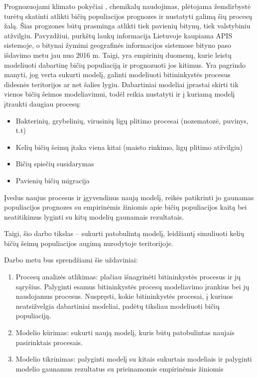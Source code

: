\documentclass{VUMIFKompMagistrinis}
\begin{document}
 Prognozuojami klimato pokyčiai \cite{IPC18}, chemikalų naudojimas, plėtojama žemdirbystė turėtų skatinti atlikti bičių populiacijos prognozes ir nustatyti galimą šių procesų žalą. Šias progzones būtų prasminga atlikti tiek pavienių bitynų, tiek valstybiniu atžvilgiu. Pavyzdžiui, purkštų laukų informacija Lietuvoje kaupiama APIS sistemoje, o bitynai žymimi geografinės informacijos sistemose bityno paso išdavimo metu jau nuo 2016 m. Taigi, yra empirinių duomenų, kurie leistų modeliuoti dabartinę bičių populiaciją ir prognozuoti jos kitimus. Yra pagrindo manyti, jog verta sukurti modelį, galinti modeliuoti bitininkystės procesus didesnės teritorijos ar net šalies lygiu. Dabartiniai modeliai įprastai skirti tik vienos bičių šeimos modeliavimui, todėl reikia nustatyti ir į kuriamą modelį įtraukti daugiau procesų: 
\begin{itemize}
\item Bakterinių, grybelinių, virusinių ligų plitimo procesai (nozematozė, puvinys, t.t)
\item Kelių bičių šeimų įtaka viena kitai (maisto rinkimo, ligų plitimo atžvilgiu)
\item Bičių spiečių susidarymas
\item Pavienių bičių migracija
\end{itemize}

Įvedus naujus procesus ir įgyvendinus naują modelį, reikės patikrinti jo gaunamas populiacijos prognozes su empirinėmis žiniomis apie bičių populiacijos kaitą bei neatitikimus lyginti su kitų modelių gaunamais rezultatais.



Taigi, šio darbo tikslas -- sukurti patobulintą modelį, leidžiantį simuliuoti kelių bičių šeimų populiacijos augimą nurodytoje teritorijoje.

Darbo metu bus sprendžiami šie uždaviniai:
\begin{enumerate}
    \item Procesų analizės atlikimas: plačiau išnagrinėti bitininkystės procesus ir jų sąryšius. Palyginti esamus bitininkystės procesų modeliavimo įrankius bei jų naudojamus procesus. Nuspręsti, kokie bitininkystės procesai, į kuriuos neatsižvelgia dabartiniai modeliai, padėtų tiksliau modeliuoti bičių populiaciją.
    \item  Modelio kūrimas: sukurti naują modelį, kuris būtų patobulintas naujais pasirinktais procesais.
    \item Modelio tikrinimas: palyginti modelį su kitais sukurtais modeliais ir palyginti modelio gaunamus rezultatus su prieinamomis empirinėmis žiniomis
\end{enumerate}
\end{document}
